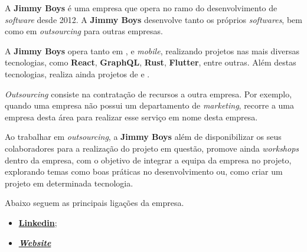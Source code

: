 
\begin{minipage}[t!]{0.35\textwidth}
\end{minipage}
\begin{minipage}[t!]{.65\textwidth}
	\minipagerestore

	A \textbf{Jimmy Boys} é uma empresa que opera no ramo do desenvolvimento de \textit{software} desde 2012. A \textbf{Jimmy Boys} desenvolve tanto os próprios \textit{softwares}, bem como em \textit{outsourcing} para outras empresas.

	A \textbf{Jimmy Boys} opera tanto em \textit{}, \textit{} e \textit{mobile}, realizando projetos nas mais diversas tecnologias, como \textbf{React}, \textbf{GraphQL}, \textbf{Rust}, \textbf{Flutter}, entre outras. Além destas tecnologias, realiza ainda projetos de  e .
\end{minipage}

\vspace{0.2cm}

\textit{Outsourcing} consiste na contratação de recursos a outra empresa. Por exemplo, quando uma empresa não possui um departamento de \textit{marketing}, recorre a uma empresa desta área para realizar esse serviço em nome desta empresa.

Ao trabalhar em \textit{outsourcing}, a \textbf{Jimmy Boys} além de disponibilizar os seus colaboradores para a realização do projeto em questão, promove ainda \textit{workshops} dentro da empresa, com o objetivo de integrar a equipa da empresa no projeto, explorando temas como boas práticas no desenvolvimento ou, como criar um projeto em determinada tecnologia.

Abaixo seguem as principais ligações da empresa.

\begin{itemize}
	\item \textbf{\href{https://www.linkedin.com/company/jimmy-boys/}{Linkedin}};
	\item \textbf{\href{https://jimmyboys.pt}{\textit{Website}}}
\end{itemize}